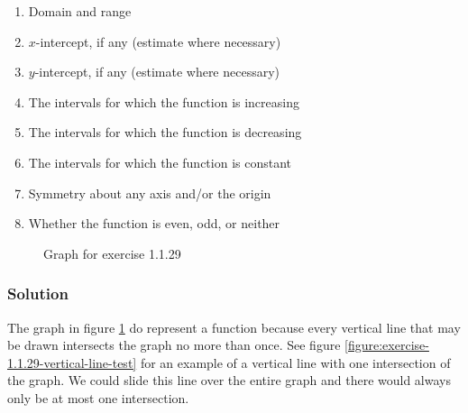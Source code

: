 \documentclass[11pt, letterpaper, oneside]{memoir}
\begin{document}
\begin{enumerate}[label=(\alph*)]
  \item Domain and range
  \item $ x $-intercept, if any (estimate where necessary)
  \item $ y $-intercept, if any (estimate where necessary)
  \item The intervals for which the function is increasing
  \item The intervals for which the function is decreasing
  \item The intervals for which the function is constant
  \item Symmetry about any axis and/or the origin
  \item Whether the function is even, odd, or neither
\end{enumerate}

\begin{figure}[H]
  \centering
  \caption{Graph for exercise 1.1.29}
  \label{figure:exercise-1.1.29}
\end{figure}

\subsubsection{Solution}

The graph in figure \ref{figure:exercise-1.1.29} do represent a function because every vertical line that may be drawn intersects the graph no more than once. See figure \ref{figure:exercise-1.1.29-vertical-line-test} for an example of a vertical line with one intersection of the graph. We could slide this line over the entire graph and there would always only be at most one intersection.
\end{document}

